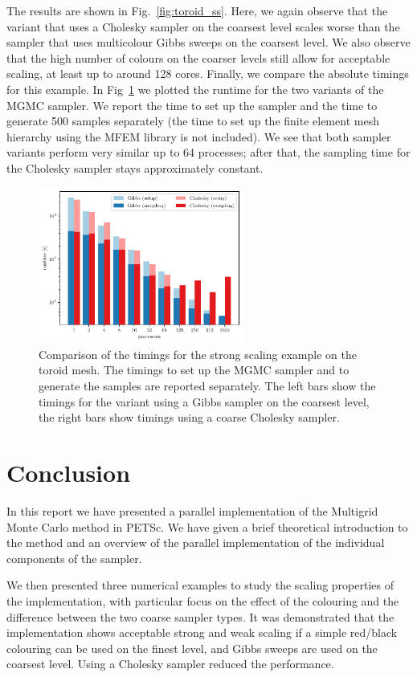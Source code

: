 \documentclass[
fontsize=11pt,
paper=a4,
numbers=noenddot
]{scrartcl}
\begin{document}
The results are shown in Fig.~\ref{fig:toroid_ss}. Here, we again observe that the variant that uses a Cholesky sampler on the coarsest level scales worse than the sampler that uses multicolour Gibbs sweeps on the coarsest level. We also observe that the high number of colours on the coarser levels still allow for acceptable scaling, at least up to around 128 cores. Finally, we compare the absolute timings for this example. In Fig~\ref{fig:timings} we plotted the runtime for the two variants of the MGMC sampler. We report the time to set up the sampler and the time to generate 500 samples separately (the time to set up the finite element mesh hierarchy using the MFEM library is not included). We see that both sampler variants perform very similar up to 64 processes; after that, the sampling time for the Cholesky sampler stays approximately constant.

\begin{figure}[htbp]
    \centering
    \includegraphics[width=0.6\textwidth]{plots/runtime.pdf}
    \caption{Comparison of the timings for the strong scaling example on the toroid mesh. The timings to set up the MGMC sampler and to generate the samples are reported separately. The left bars show the timings for the variant using a Gibbs sampler on the coarsest level, the right bars show timings using a coarse Cholesky sampler.}
    \label{fig:timings}
\end{figure}

\section{Conclusion}
In this report we have presented a parallel implementation of the Multigrid Monte Carlo method in PETSc. We have given a brief theoretical introduction to the method and an overview of the parallel implementation of the individual components of the sampler.

We then presented three numerical examples to study the scaling properties of the implementation, with particular focus on the effect of the colouring and the difference between the two coarse sampler types. It was demonstrated that the implementation shows acceptable strong and weak scaling if a simple red/black colouring can be used on the finest level, and Gibbs sweeps are used on the coarsest level. Using a Cholesky sampler reduced the performance.
\end{document}
